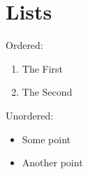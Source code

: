 \section{Lists}

Ordered:
\begin{enumerate}
  \item The First
  \item The Second
\end{enumerate}

Unordered:
\begin{itemize}
  \item Some point
  \item Another point
\end{itemize}
